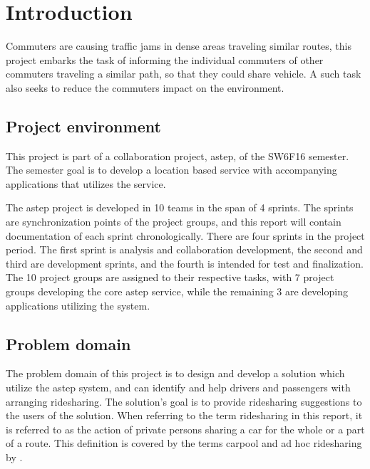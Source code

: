 \chapter{Introduction}\label{ch:introduction}


Commuters are causing traffic jams in dense areas traveling similar routes, this project embarks the task of informing the individual commuters of other commuters traveling a similar path, so that they could share vehicle.
A such task also seeks to reduce the commuters impact on the environment.


\section{Project environment}
This project is part of a collaboration project, \gls{astep}, of the SW6F16 semester.
The semester goal is to develop a location based service with accompanying applications that utilizes the service. 

The \gls{astep} project is developed in 10 teams in the span of 4 sprints.
The sprints are synchronization points of the project groups, and this report will contain documentation of each sprint chronologically.
There are four sprints in the project period.
The first sprint is analysis and collaboration development, the second and third are development sprints, and the fourth is intended for test and finalization.
The 10 project groups are assigned to their respective tasks, with 7 project groups developing the core \gls{astep} service, while the remaining 3 are developing applications utilizing the system.



\section{Problem domain}
The problem domain of this project is to design and develop a solution which utilize the \gls{astep} system, and can identify and help drivers and passengers with arranging ridesharing.
The solution's goal is to provide ridesharing suggestions to the users of the solution.
When referring to the term ridesharing in this report, it is referred to as the action of private persons sharing a car for the whole or a part of a route. 
This definition is covered by the terms carpool and ad hoc ridesharing by \citet{doi:10.1080/01441647.2011.621557}.  

